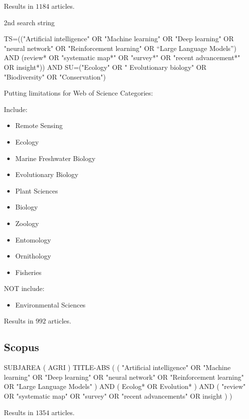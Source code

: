 \documentclass{article}
\newcommand{\bei}{\begin{itemize}}
\newcommand{\eei}{\end{itemize}}
\begin{document}
Results in $1184$ articles.

2nd search string

TS=(("Artificial intelligence" OR "Machine learning" OR "Deep learning" OR "neural network" OR "Reinforcement learning" OR “Large Language Models”) AND (review* OR "systematic map*" OR "survey*" OR "recent advancement*" OR insight*)) AND SU=("Ecology" OR " Evolutionary biology" OR "Biodiversity" OR "Conservation")

Putting limitations for Web of Science Categories:

Include:
\bei
\item Remote Sensing
\item Ecology
\item Marine Freshwater Biology
\item Evolutionary Biology
\item Plant Sciences
\item Biology
\item Zoology
\item Entomology
\item Ornithology
\item Fisheries
\eei
NOT include:
\bei
\item Environmental Sciences
\eei

Results in $992$ articles.

\subsection{Scopus}
SUBJAREA ( AGRI ) TITLE-ABS ( ( "Artificial intelligence" OR "Machine learning" OR "Deep learning" OR "neural network" OR "Reinforcement learning" OR "Large Language Models" ) AND ( Ecolog* OR Evolution* ) AND ( "review" OR "systematic map" OR "survey" OR "recent advancements" OR insight ) )

Results in $1354$ articles.
\end{document}
